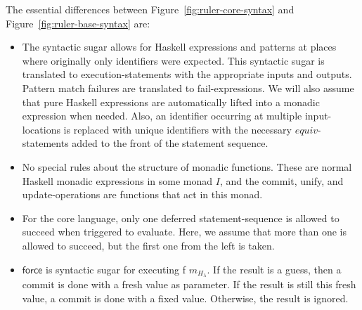 \documentclass[preprint,natbib]{sigplanconf}
\newcommand{\Varid}[1]{\mathit{#1}}
\newcommand\Statement{c}
\newcommand\SchemeName{s}
\newcommand\Idents[1]{{#1}^{\!*}}
\newcommand\Haskell{H_{\!\lambda}}
\newcommand\Defer{\mathsf{defer}}
\newcommand\Commit{\mathsf{commit}}
\newcommand\Onebyone{\mathsf{onebyone}}
\newcommand\Force{\mathsf{force}}
\newcommand\Let{\mathsf{let}}
\newcommand\sembrack[1]{\llbracket #1 \rrbracket}
\begin{document}
    The essential differences between Figure~\ref{fig:ruler-core-syntax} and Figure~\ref{fig:ruler-base-syntax} are:
    \begin{itemize}
    \item The syntactic sugar allows for Haskell expressions and patterns at places where originally only identifiers were
      expected. This syntactic sugar is translated to execution-statements with the appropriate inputs and outputs.
      Pattern match failures are translated to fail-expressions. We will also assume that pure Haskell expressions are automatically lifted into
      a monadic expression when needed. Also, an identifier occurring at multiple input-locations is replaced with unique identifiers with the
      necessary \ensuremath{\Varid{equiv}}-statements added to the front of the statement sequence.
    \item No special rules about the structure of monadic functions. These are normal Haskell monadic expressions in some
      monad $I$, and the commit, unify, and update-operations are functions that act in this monad.
    \item For the core language, only one deferred statement-sequence is allowed to succeed when triggered to evaluate. Here, we
          assume that more than one is allowed to succeed, but the first one from the left is taken.
    \item $\Force$ is syntactic sugar for executing f $m_{\Haskell}$. If the result is a guess, then a commit is done with a fresh
      value as parameter. If the result is still this fresh value, a commit is done with a fixed value. Otherwise, the result is ignored.

\end{itemize}
\end{document}

